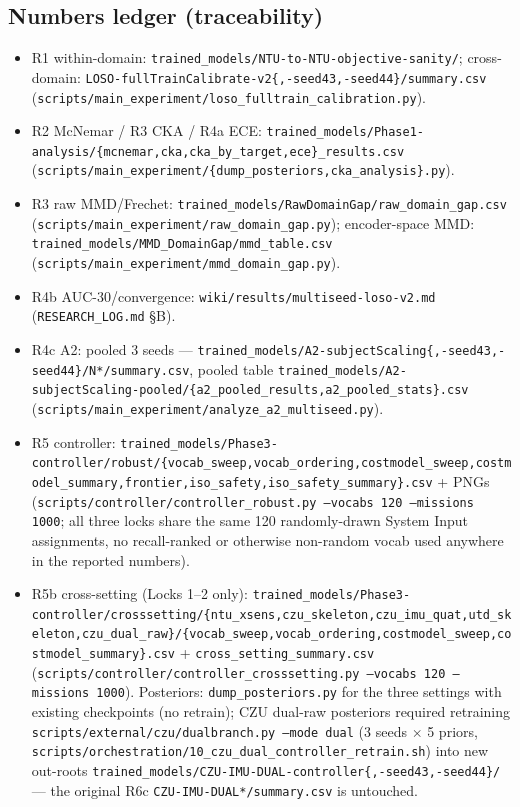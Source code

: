 \subsection{Numbers ledger (traceability)}
\begin{itemize}
  \item R1 within-domain: \texttt{trained\_models/NTU-to-NTU-objective-sanity/}; cross-domain: \texttt{LOSO-fullTrainCalibrate-v2\{,-seed43,-seed44\}/summary.csv} (\texttt{scripts/main\_experiment/loso\_fulltrain\_calibration.py}).
  \item R2 McNemar / R3 CKA / R4a ECE: \texttt{trained\_models/Phase1-analysis/\{mcnemar,cka,cka\_by\_target,ece\}\_results.csv} (\texttt{scripts/main\_experiment/\{dump\_posteriors,cka\_analysis\}.py}).
  \item R3 raw MMD/Frechet: \texttt{trained\_models/RawDomainGap/raw\_domain\_gap.csv} (\texttt{scripts/main\_experiment/raw\_domain\_gap.py}); encoder-space MMD: \texttt{trained\_models/MMD\_DomainGap/mmd\_table.csv} (\texttt{scripts/main\_experiment/mmd\_domain\_gap.py}).
  \item R4b AUC-30/convergence: \texttt{wiki/results/multiseed-loso-v2.md} (\texttt{RESEARCH\_LOG.md} \S{}B).
  \item R4c A2: pooled 3 seeds --- \texttt{trained\_models/A2-subjectScaling\{,-seed43,-seed44\}/N*/summary.csv}, pooled table \texttt{trained\_models/A2-subjectScaling-pooled/\{a2\_pooled\_results,a2\_pooled\_stats\}.csv} (\texttt{scripts/main\_experiment/analyze\_a2\_multiseed.py}).
  \item R5 controller: \texttt{trained\_models/Phase3-controller/robust/\{vocab\_sweep,vocab\_ordering,costmodel\_sweep,costmodel\_summary,frontier,iso\_safety,iso\_safety\_summary\}.csv} + PNGs (\texttt{scripts/controller/controller\_robust.py --vocabs 120 --missions 1000}; all three locks share the same 120 randomly-drawn System Input assignments, no recall-ranked or otherwise non-random vocab used anywhere in the reported numbers).
  \item R5b cross-setting (Locks 1--2 only): \texttt{trained\_models/Phase3-controller/crosssetting/\{ntu\_xsens,czu\_skeleton,czu\_imu\_quat,utd\_skeleton,czu\_dual\_raw\}/\{vocab\_sweep,vocab\_ordering,costmodel\_sweep,costmodel\_summary\}.csv} + \texttt{cross\_setting\_summary.csv} (\texttt{scripts/controller/controller\_crosssetting.py --vocabs 120 --missions 1000}). Posteriors: \texttt{dump\_posteriors.py} for the three settings with existing checkpoints (no retrain); CZU dual-raw posteriors required retraining \texttt{scripts/external/czu/dualbranch.py --mode dual} (3 seeds $\times$ 5 priors, \texttt{scripts/orchestration/10\_czu\_dual\_controller\_retrain.sh}) into new out-roots \texttt{trained\_models/CZU-IMU-DUAL-controller\{,-seed43,-seed44\}/} --- the original R6c \texttt{CZU-IMU-DUAL*/summary.csv} is untouched.

\end{itemize}
